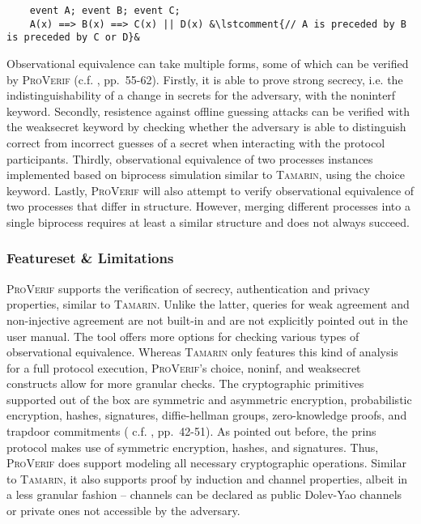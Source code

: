 \begin{lstlisting}
    event A; event B; event C;
    A(x) ==> B(x) ==> C(x) || D(x) &\lstcomment{// A is preceded by B is preceded by C or D}&
\end{lstlisting}

Observational equivalence can take multiple forms, some of which can be verified by \textsc{ProVerif} (c.f. \cite{blanchet2020proverif}, pp.~55-62).
Firstly, it is able to prove strong secrecy, i.e. the indistinguishability of a change in secrets for the adversary, with the \textsf{noninterf} keyword.
Secondly, resistence against offline guessing attacks can be verified with the \textsf{weaksecret} keyword by checking whether the adversary is able to distinguish correct from incorrect guesses of a secret when interacting with the protocol participants.
Thirdly, observational equivalence of two processes instances implemented based on biprocess simulation similar to \textsc{Tamarin}, using the \textsf{choice} keyword.
Lastly, \textsc{ProVerif} will also attempt to verify observational equivalence of two processes that differ in structure.
However, merging different processes into a single biprocess requires at least a similar structure and does not always succeed.

\subsubsection{Featureset \& Limitations}

\textsc{ProVerif} supports the verification of secrecy, authentication and privacy properties, similar to \textsc{Tamarin}.
Unlike the latter, queries for weak agreement and non-injective agreement are not built-in and are not explicitly pointed out in the user manual.
The tool offers more options for checking various types of observational equivalence.
Whereas \textsc{Tamarin} only features this kind of analysis for a full protocol execution, \textsc{ProVerif}'s \textsf{choice}, \textsf{noninf}, and \textsf{weaksecret} constructs allow for more granular checks.
The cryptographic primitives supported out of the box are symmetric and asymmetric encryption, probabilistic encryption, hashes, signatures, diffie-hellman groups,
zero-knowledge proofs, and trapdoor commitments ( c.f. \cite{blanchet2020proverif}, pp.~42-51).
As pointed out before, the \gls{prins} protocol makes use of symmetric encryption, hashes, and signatures.
Thus, \textsc{ProVerif} does support modeling all necessary cryptographic operations.
Similar to \textsc{Tamarin}, it also supports proof by induction and channel properties, albeit in a less granular fashion -- channels can be declared as public Dolev-Yao channels or private ones not accessible by the adversary.

